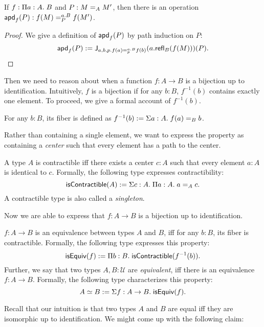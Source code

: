 \documentclass{article}
\newcommand{\calU}{\mathcal{U}}
\begin{document}
\begin{lemma}
	If $f : \hpitype{a}{A}{B}$ and $P: \Ideq{A}{M}{M'}$, then there is an 
	operation $\hapd{f}{P} : \DIdeq{a.B}{P}{f(M)}{f(M')}$.
\end{lemma}
\begin{proof}
	We give a definition of $\hapd{f}{P}$ by path induction on $P$:
	\[
	\hapd{f}{P} \eqdef \Idelim{a,b,p. 
	 \DIdeq{a.B}{p}{f(a)}{f(b)} }{a. \refl{B}{f(M)} 
	}{P}.
	\]
\end{proof}

Then we need to reason about when a function $f : A \to B$ is a bijection up to 
identification.
Intuitively, $f$ is a bijection if for any $b : B$, $f^{-1}(b)$ contains exactly 
one element.
To proceed, we give a formal account of $f^{-1}(b)$.

\begin{definition}[Fibers]
	For any $b : B$, its fiber is defined as $f^{-1}(b) \eqdef \hsigtype{a}{A}{ 
	\Ideq{B}{f(a)}{b} }$.
\end{definition}

Rather than containing a single element, we want to express the property as 
containing a \emph{center} such that every element has a path to the center.

\begin{definition}[Contractibility]
	A type $A$ is contractible iff there exists a center $c : A$ such that every 
	element $a : A$ is identical to $c$.
	Formally, the following type expresses contractibility:
	\[
	\mathsf{isContractible}(A) \eqdef  \hsigtype{c}{A}{ \hpitype{a}{A}{ 
			\Ideq{A}{a}{c} } }.
	\]
	A contractible type is also called a \emph{singleton}.
\end{definition}

Now we are able to express that $f : A \to B$ is a bijection up to identification.

\begin{definition}[Equivalences]
	$f : A \to B$ is an equivalence between types $A$ and $B$, iff for any $b : B$, 
	its fiber is contractible.
	Formally, the following type expresses this property:
	\[
	\mathsf{isEquiv}(f) \eqdef  
	\hpitype{b}{B}{\mathsf{isContractible}(f^{-1}(b))}.
	\]
	Further, we say that two types $A,B : \calU$ are \emph{equivalent}, iff there 
	is an equivalence $f : A \to B$.
	Formally, the following type characterizes this property:
	\[
	A \simeq B \eqdef \hsigtype{f}{A \to B}{\mathsf{isEquiv}(f)}.
	\]
\end{definition}

Recall that our intuition is that two types $A$ and $B$ are equal iff they are 
isomorphic up to identification.
We might come up with the following claim:
\end{document}
